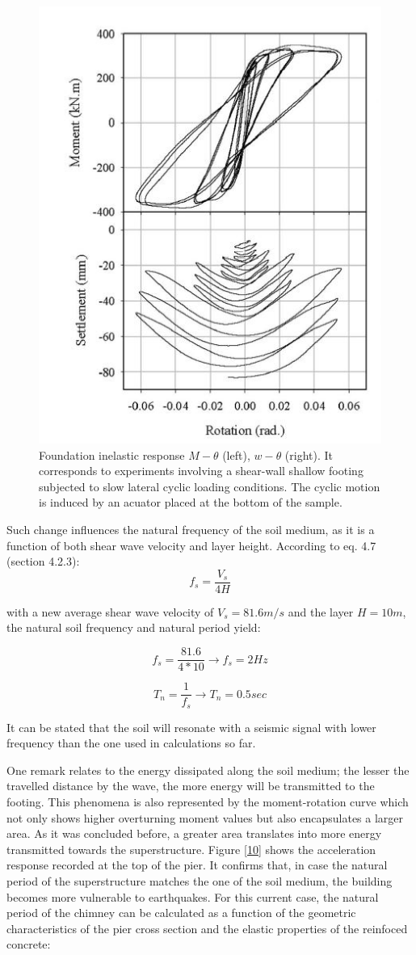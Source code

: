  \begin{figure}[!h]
 	\centering
 	\includegraphics[width=0.5 \linewidth]{"gazetas"}
 	\caption{Foundation inelastic response $M-\theta$ (left), $w-\theta$ (right). It corresponds to experiments involving a shear-wall shallow footing subjected to slow lateral cyclic loading conditions. The cyclic motion is induced by an acuator placed at the bottom of the sample.}
 	\label{gaza}
 \end{figure}

Such change influences the natural frequency of the soil medium, as it is a function of both shear wave velocity and layer height. According to eq. 4.7 (section 4.2.3):
\begin{equation}
	f_s=\frac{V_s}{4H}
\end{equation}

with a new average shear wave velocity of $V_s=81.6 m/s$ and the layer $H=10m$, the natural soil frequency and natural period yield:

\begin{equation}
	f_s=\frac{81.6}{4 * 10} \longrightarrow f_s=2 Hz
\end{equation}
 
 \begin{equation}
 	T_n=\frac{1}{f_s} \longrightarrow T_n=0.5 sec
 \end{equation}

It can be stated that the soil will resonate with a seismic signal with lower frequency than the one used in calculations so far.

One remark relates to the energy dissipated along the soil medium; the lesser the travelled distance by the wave, the more energy will be transmitted to the footing. This phenomena is also represented by the moment-rotation curve which not only shows higher overturning moment values but also encapsulates a larger area. As it was concluded before, a greater area translates into more energy transmitted towards the superstructure. Figure \ref{10} shows the acceleration response recorded at the top of the pier. It confirms that, in case the natural period of the superstructure matches the one of the soil medium, the building becomes more vulnerable to earthquakes. For this current case, the natural period of the chimney can be calculated as a function of the geometric characteristics of the pier cross section and the elastic properties of the reinfoced concrete:


